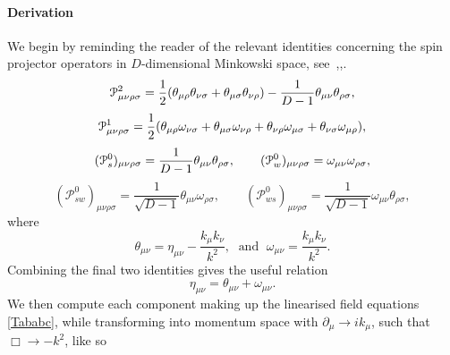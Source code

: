 \paragraph{Derivation}
We begin by reminding the reader of the relevant identities concerning the spin projector operators in $D$-dimensional Minkowski space, see~\cite{Biswas:2013kla},\cite{VanNieuwenhuizen:1973fi},\cite{Conroy:2015nva}.
\begin{equation}
\mathcal{P}^{2}_{\mu\nu\rho\sigma}=\frac{1}{2}(\theta_{\mu \rho}\theta_{\nu \sigma}+\theta_{\mu
\sigma}\theta_{\nu \rho} ) - \frac{1}{D-1}\theta_{\mu \nu}\theta_{\rho
\sigma},\nonumber
\end{equation}
\begin{equation}
\nonumber
\mathcal{P}^{1}_{\mu\nu\rho\sigma}=\frac{1}{2}( \theta_{\mu \rho}\omega_{\nu \sigma}+\theta_{\mu
\sigma}\omega_{\nu \rho}+\theta_{\nu \rho}\omega_{\mu \sigma}+\theta_{\nu
\sigma}\omega_{\mu \rho} ),
\end{equation}
\begin{equation}
\nonumber
(\mathcal{P}_{s}^{0})_{\mu\nu\rho\sigma}=\frac{1}{D-1}\theta_{\mu \nu} \theta_{\rho \sigma},
\qquad
(\mathcal{P}_{w}^{0})_{\mu\nu\rho\sigma}=\omega_{\mu \nu}\omega_{\rho \sigma},
\end{equation}
\begin{equation}
(\mathcal{P}_{sw}^{0})_{\mu\nu\rho\sigma}=\frac{1}{\sqrt{D-1}}\theta_{\mu \nu}\omega_{\rho \sigma},
\qquad 
(\mathcal{P}_{ws}^{0})_{\mu\nu\rho\sigma}=\frac{1}{\sqrt{D-1}}\omega_{\mu \nu}\theta_{\rho \sigma},
\label{spin1}
\end{equation}
where
\begin{equation}
\theta_{\mu \nu}=\eta_{\mu \nu}-\frac{k_{\mu}k_{\nu}}{k^2},\;
\mbox{  and  } \;
\omega_{\mu \nu}=\frac{k_{\mu}k_{\nu}}{k^2}.
\label{spin2}
\end{equation}
Combining the final two identities gives the useful relation
\[
\eta_{\mu\nu}=\theta_{\mu\nu}+\omega_{\mu\nu}
.\]
We then compute each component making up the linearised field equations \eqref{Tababc}, while transforming into momentum space with $\partial_\mu\rightarrow ik_\mu$, such that $\Box\rightarrow -k^2$, like so
